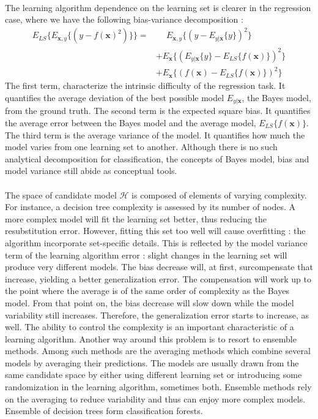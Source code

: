 \documentclass[a4paper]{report}
\begin{document}
\paragraph{}
The learning algorithm dependence on the learning set is clearer in the regression case, where we have the following bias-variance decomposition : 
\begin{align*}
	E_{LS} \{ E_{\boldsymbol{x},y} \{ (y - f(\boldsymbol{x})^2)\} \} = &\phantom{+} E_{\boldsymbol{x},y} \{ (y - E_{y|\boldsymbol{x}}\{ y\})^2 \}  \\
	                                                                   &+ E_{\boldsymbol{x}} \{ (E_{y|\boldsymbol{x}}\{ y\} - E_{LS}\{f(\boldsymbol{x})\})^2 \}  \\
																																	   &+ E_{\boldsymbol{x}} \{ (f(\boldsymbol{x}) -  E_{LS}\{f(\boldsymbol{x})\})^2 \}
\end{align*}
The first term, characterize the intrinsic difficulty of the regression task. It quantifies the average deviation of the best possible model $E_{y|\boldsymbol{x}}$, the Bayes model, from the ground truth.
The second term is the expected square bias. It quantifies the average error between the Bayes model and the average model, $E_{LS}\{f(\boldsymbol{x})\}$. 
The third term is the average variance of the model. It quantifies how much the model varies from one learning set to another. 
Although there is no such analytical decomposition for classification, the concepts of Bayes model, bias and model variance still abide as conceptual tools.
\paragraph{}
The space of candidate model $\mathcal{H}$ is composed of elements of varying complexity. For instance, a decision tree complexity is assessed by its number of nodes. A more complex model will fit the learning set better, thus reducing the resubstitution error. However, fitting this set too well will cause overfitting : the algorithm incorporate set-specific details. This is reflected by the model variance term of the learning algorithm error : slight changes in the learning set will produce very different models. The bias decrease will, at first, surcompensate that increase, yielding a better generalization error. The compensation will work up to the point where the average is of the same order of complexity as the Bayes model. From that point on, the bias decrease will slow down while the model variability still increases. Therefore, the generalization error starts to increase, as well.
The ability to control the complexity is an important characteristic of a learning algorithm. Another way around this problem is to resort to ensemble methods. Among such methods are the averaging methods which combine several models by averaging their predictions. The models are usually drawn from the same candidate space by either using different learning set or introducing some randomization in the learning algorithm, sometimes both. Ensemble methods rely on the averaging to reduce variability and thus can enjoy more complex models. Ensemble of decision trees form classification forests.
\end{document}
